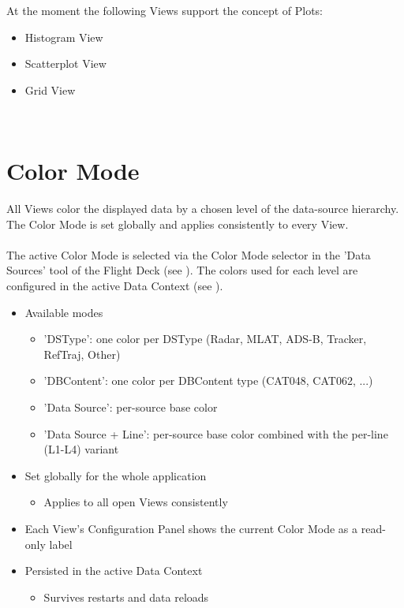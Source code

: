 At the moment the following Views support the concept of Plots:

\begin{itemize}
  \item Histogram View
  \item Scatterplot View
  \item Grid View
 \end{itemize} \ \\

\section{Color Mode}
\label{sec:color_mode}

All Views color the displayed data by a chosen level of the data-source hierarchy. The Color Mode is set globally and applies consistently to every View. \\\\

The active Color Mode is selected via the Color Mode selector in the 'Data Sources' tool of the Flight Deck (see ). The colors used for each level are configured in the active Data Context (see ). \\

\begin{itemize}
\item Available modes
\begin{itemize}
\item 'DSType': one color per DSType (Radar, MLAT, ADS-B, Tracker, RefTraj, Other)
\item 'DBContent': one color per DBContent type (CAT048, CAT062, ...)
\item 'Data Source': per-source base color
\item 'Data Source + Line': per-source base color combined with the per-line (L1-L4) variant
\end{itemize}
\item Set globally for the whole application
\begin{itemize}
\item Applies to all open Views consistently
\end{itemize}
\item Each View's Configuration Panel shows the current Color Mode as a read-only label
\item Persisted in the active Data Context
\begin{itemize}
\item Survives restarts and data reloads
\end{itemize}
\end{itemize} \ \\

